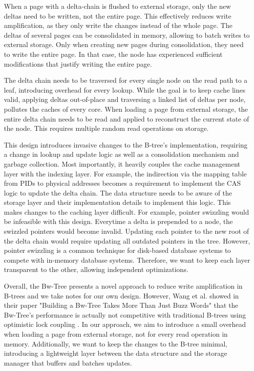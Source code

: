 When a page with a delta-chain is flushed to external storage, only the new deltas need to be written, not the entire page.
This effectively reduces write amplification, as they only write the changes instead of the whole page.
The deltas of several pages can be consolidated in memory, allowing to batch writes to external storage.
Only when creating new pages during consolidation, they need to write the entire page.
In that case, the node has experienced sufficient modifications that justify writing the entire page.

The delta chain needs to be traversed for every single node on the read path to a leaf, introducing overhead for every lookup.
While the goal is to keep cache lines valid, applying deltas out-of-place and traversing a linked list of deltas per node, pollutes the caches of every core.
When loading a page from external storage, the entire delta chain needs to be read and applied to reconstruct the current state of the node.
This requires multiple random read operations on storage.

This design introduces invasive changes to the B-tree's implementation, requiring a change in lookup and update logic as well as a consolidation mechanism and garbage collection. 
Most importantly, it heavily couples the cache management layer with the indexing layer.
For example, the indirection via the mapping table from \ac{PID}s to physical addresses becomes a requirement to implement the \ac{CAS} logic to update the delta chain.
The data structure needs to be aware of the storage layer and their implementation details to implement this logic.
This makes changes to the caching layer difficult. 
For example, pointer swizzling \cite{graefe2014memory} would be infeasible with this design. 
Everytime a delta is prepended to a node, the swizzled pointers would become invalid.
Updating each pointer to the new root of the delta chain would require updating all outdated pointers in the tree.
However, pointer swizzling is a common technique for disk-based database systems \cite{leis2018leanstore} to compete with in-memory database systems.
Therefore, we want to keep each layer transparent to the other, allowing independent optimizations.

Overall, the Bw-Tree presents a novel approach to reduce write amplification in B-trees and we take notes for our own design.
However, Wang et al. showed in their paper "Building a Bw-Tree Takes More Than Just Buzz Words" \cite{wang2018bwtree} that the Bw-Tree's performance is actually not competitive with traditional B-trees using optimistic lock coupling \cite{leis2019optimistic}.
In our approach, we aim to introduce a small overhead when loading a page from external storage, not for every read operation in memory.
Additionally, we want to keep the changes to the B-tree minimal, introducing a lightweight layer between the data structure and the storage manager that buffers and batches updates.   

